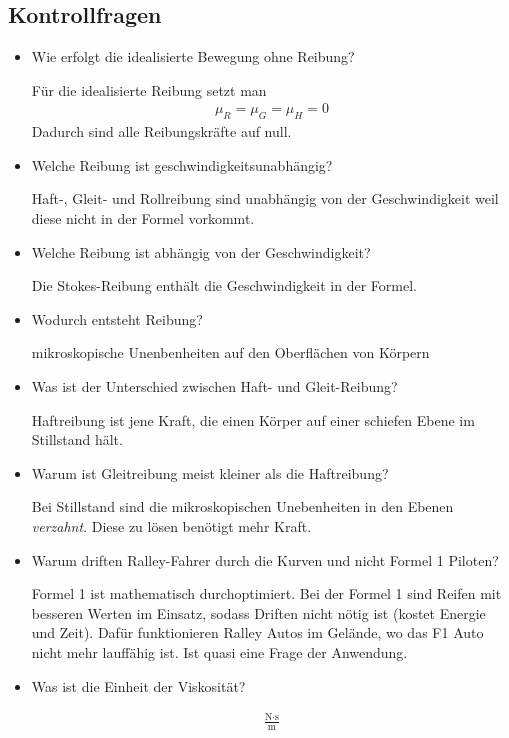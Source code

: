 \documentclass{article}
\begin{document}
\subsection{Kontrollfragen}
\begin{itemize}
\item Wie erfolgt die idealisierte Bewegung ohne Reibung?


Für die idealisierte Reibung setzt man 
\begin{align*}
\mu_R = \mu_G = \mu_H = 0
\end{align*}
Dadurch sind alle Reibungskräfte auf null.

\item Welche Reibung ist geschwindigkeitsunabhängig?

Haft-, Gleit- und Rollreibung sind unabhängig von der Geschwindigkeit weil diese nicht in der Formel vorkommt. 

\item Welche Reibung ist abhängig von der Geschwindigkeit?

Die Stokes-Reibung enthält die Geschwindigkeit in der Formel.


\item Wodurch entsteht Reibung?

mikroskopische Unenbenheiten auf den Oberflächen von Körpern

\item Was ist der Unterschied zwischen Haft- und Gleit-Reibung?

Haftreibung ist jene Kraft, die einen Körper auf einer schiefen Ebene im Stillstand hält.

\item Warum ist Gleitreibung meist kleiner als die Haftreibung?

Bei Stillstand sind die mikroskopischen Unebenheiten in den Ebenen \textit{verzahnt}. Diese zu lösen benötigt mehr Kraft.

\item Warum driften Ralley-Fahrer durch die Kurven und nicht Formel 1 Piloten?

Formel 1 ist mathematisch durchoptimiert. Bei der Formel 1 sind Reifen mit besseren Werten im Einsatz, sodass Driften nicht nötig ist (kostet Energie und Zeit). Dafür funktionieren Ralley Autos im Gelände, wo das F1 Auto nicht mehr lauffähig ist. Ist quasi eine Frage der Anwendung.

\item Was ist die Einheit der Viskosität?

\begin{align*}
\frac{\text{N}\cdot \text{s}}{\text{m}}
\end{align*}


\end{itemize}
\end{document}
